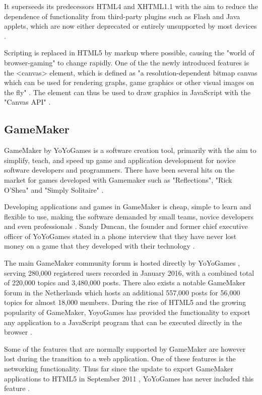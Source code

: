 \documentclass[bsc, 12pt, twoside, singlespacing, parskip, abbrevs, notimes, normalheadings, logo]{styles/infthesis}
\begin{document}
It superseeds its predecessors HTML4 and XHTML1.1 with the aim to reduce the dependence of functionality from third-party plugins such as Flash and Java applets, which are now either deprecated or entirely unsupported by most devices \cite{Death_Flash_Java}.

Scripting is replaced in HTML5 by markup where possible, causing the "world of browser-gaming" to change rapidly. One of the the newly introduced features is the <canvas> element, which is defined as "a resolution-dependent bitmap canvas which can be used for rendering graphs, game graphics or other visual images on the fly" \cite{HTML5_Up_and_Running}. The element can thus be used to draw graphics in JavaScript with the "Canvas API" \cite{Canvas_API}.

\subsection{GameMaker}
GameMaker by YoYoGames is a software creation tool, primarily with the aim to simplify, teach, and speed up game and application development for novice software developers and programmers. There have been several hits on the market for games developed with Gamemaker such as "Reflections", "Rick O'Shea" and "Simply Solitaire" \cite{Gamemaker_DnD}.

Developing applications and games in GameMaker is cheap, simple to learn and flexible to use, making the software demanded by small teams, novice developers and even professionals \cite{Mark_Overmars}. Sandy Duncan, the founder and former chief executive officer of YoYoGames stated in a phone interview that they have never lost money on a game that they developed with their technology \cite{Gamemaker_DnD}.

The main GameMaker community forum is hosted directly by YoYoGames \cite{yoyogames_forum}, serving 280,000 registered users recorded in January 2016, with a combined total of 220,000 topics and 3,480,000 posts. There also exists a notable GameMaker forum in the Netherlands \cite{dutch_gamemaker_forum} which hosts an additional 557,000 posts for 56,000 topics for almost 18,000 members. During the rise of HTML5 and the growing popularity of GameMaker, YoyoGames has provided the functionality to export any application to a JavaScript program that can be executed directly in the browser \cite{GameMaker_Studio}.

Some of the features that are normally supported by GameMaker are however lost during the transition to a web application. One of these features is the networking functionality. Thus far since the update to export GameMaker applications to HTML5 in September 2011 \cite{HTML5_Game_Dev_Gamemaker}, YoYoGames has never included this feature \cite{gamemaker_missing_networking}.
\end{document}
